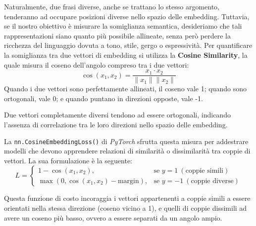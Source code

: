 Naturalmente, due frasi diverse, anche se trattano lo stesso argomento, tenderanno ad occupare posizioni diverse nello spazio delle embedding. Tuttavia, se il nostro obiettivo è misurare la somiglianza semantica, desideriamo che tali rappresentazioni siano quanto più possibile allineate, senza però perdere la ricchezza del linguaggio dovuta a tono, stile, gergo o espressività. Per quantificare la somiglianza tra due vettori di embedding si utilizza la \textbf{Cosine Similarity}, la quale misura il coseno dell’angolo compreso tra i due vettori:
\[
\cos(x_1, x_2) = \frac{x_1 \cdot x_2}{\|x_1\| \|x_2\|}
\]
Quando i due vettori sono perfettamente allineati, il coseno vale 1; quando sono ortogonali, vale 0; e quando puntano in direzioni opposte, vale -1.

\begin{Osservazione}
    Due vettori completamente diversi tendono ad essere ortogonali, indicando l’assenza di correlazione tra le loro direzioni nello spazio delle embedding.
\end{Osservazione}

La \texttt{nn.CosineEmbeddingLoss()} di \textit{PyTorch} sfrutta questa misura per addestrare modelli che devono apprendere relazioni di similarità o dissimilarità tra coppie di vettori. La sua formulazione è la seguente:
\begin{equation}
L = 
\begin{cases} 
1 - \cos(x_1, x_2), & \text{se } y = 1 \ (\text{coppie simili}) \\
\max(0, \cos(x_1, x_2) - \text{margin}), & \text{se } y = -1 \ (\text{coppie diverse})
\end{cases}
\end{equation}

Questa funzione di costo incoraggia i vettori appartenenti a coppie simili a essere orientati nella stessa direzione (coseno vicino a 1), e quelli di coppie dissimili ad avere un coseno più basso, ovvero a essere separati da un angolo ampio.  
